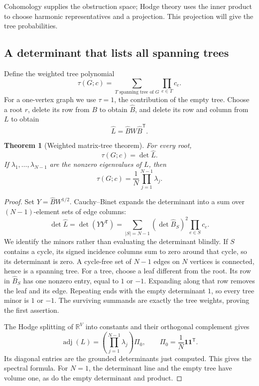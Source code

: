 \documentclass[11pt]{article}
\newtheorem{theorem}{Theorem}[section]
\theoremstyle{definition}
\theoremstyle{remark}
\newcommand{\R}{\mathbb R}
\begin{document}
Cohomology supplies the obstruction space; Hodge theory uses the inner product to choose harmonic representatives and a projection. This projection will give the tree probabilities.

\subsection{A determinant that lists all spanning trees}

Define the weighted tree polynomial
\[
 \tau(G;c)=\sum_{T\text{ spanning tree of }G}\prod_{e\in T}c_e.
\]
For a one-vertex graph we use $\tau=1$, the contribution of the empty tree. Choose a root $r$, delete its row from $B$ to obtain $\widehat B$, and delete its row and column from $L$ to obtain
\[
 \widehat L=\widehat B W\widehat B^{\mathsf T}.
\]

\begin{theorem}[Weighted matrix-tree theorem]\label{thm:glin-matrix-tree}
For every root,
\begin{equation}\label{eq:glin-matrix-tree}
 \tau(G;c)=\det\widehat L.
\end{equation}
If $\lambda_1,\ldots,\lambda_{N-1}$ are the nonzero eigenvalues of $L$, then
\begin{equation}\label{eq:glin-spectral-tree}
 \tau(G;c)=\frac1N\prod_{j=1}^{N-1}\lambda_j.
\end{equation}
\end{theorem}
\begin{proof}
Set $Y=\widehat B W^{1/2}$. Cauchy--Binet expands the determinant into a sum over $(N-1)$-element sets of edge columns:
\[
 \det\widehat L=\det(YY^{\mathsf T})
 =\sum_{|S|=N-1}(\det\widehat B_S)^2\prod_{e\in S}c_e.
\]
We identify the minors rather than evaluating the determinant blindly. If $S$ contains a cycle, its signed incidence columns sum to zero around that cycle, so its determinant is zero. A cycle-free set of $N-1$ edges on $N$ vertices is connected, hence is a spanning tree. For a tree, choose a leaf different from the root. Its row in $\widehat B_S$ has one nonzero entry, equal to $1$ or $-1$. Expanding along that row removes the leaf and its edge. Repeating ends with the empty determinant $1$, so every tree minor is $1$ or $-1$. The surviving summands are exactly the tree weights, proving the first assertion.

The Hodge splitting of $\R^V$ into constants and their orthogonal complement gives
\[
 \operatorname{adj}(L)=
 \left(\prod_{j=1}^{N-1}\lambda_j\right)\Pi_0,
 \qquad \Pi_0=\frac1N\mathbf1\mathbf1^{\mathsf T}.
\]
Its diagonal entries are the grounded determinants just computed. This gives the spectral formula. For $N=1$, the determinant line and the empty tree have volume one, as do the empty determinant and product.
\end{proof}
\end{document}
